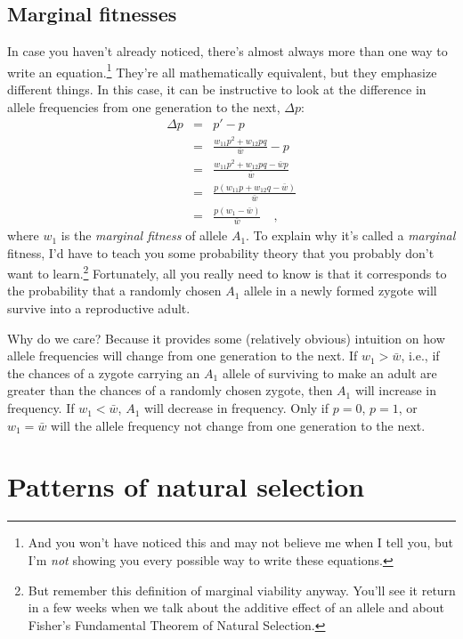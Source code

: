 \subsection*{Marginal fitnesses}

In case you haven't already noticed, there's almost always more than
one way to write an equation.\footnote{And you won't have noticed this
  and may not believe me when I tell you, but I'm {\it not\/} showing
  you every possible way to write these equations.} They're all
mathematically equivalent, but they emphasize different things. In
this case, it can be instructive to look at the difference in allele
frequencies from one generation to the next, $\Delta p$:
\begin{eqnarray*}
\Delta p &=& p' - p \\
&=& \frac{w_{11}p^2 + w_{12}pq}{\bar w} - p \\
&=& \frac{w_{11}p^2 + w_{12}pq - \bar wp}{\bar w} \\
&=& \frac{p(w_{11}p + w_{12}q - \bar w)}{\bar w} \\
&=& \frac{p(w_1 - \bar w)}{\bar w} \quad ,
\end{eqnarray*}
where $w_1$ is the {\it marginal fitness\/} of allele $A_1$. To
explain why it's called a {\it marginal\/} fitness, I'd have to teach
you some probability theory that you probably don't want to
learn.\footnote{But remember this definition of marginal viability
anyway. You'll see it return in a few weeks when we talk about the
additive effect of an allele and about Fisher's Fundamental Theorem of
Natural Selection.} Fortunately, all you really need to know is that
it corresponds to the probability that a randomly chosen $A_1$ allele
in a newly formed zygote will survive into a reproductive
adult.

Why do we care? Because it provides some (relatively obvious)
intuition on how allele frequencies will change from one generation to
the next. If $w_1 > \bar w$, i.e., if the chances of a zygote carrying
an $A_1$ allele of surviving to make an adult are greater than the
chances of a randomly chosen zygote, then $A_1$ will increase in
frequency. If $w_1 < \bar w$, $A_1$ will decrease in frequency. Only
if $p=0$, $p=1$, or $w_1=\bar w$ will the allele frequency not change
from one generation to the next.

\section*{Patterns of natural selection}

